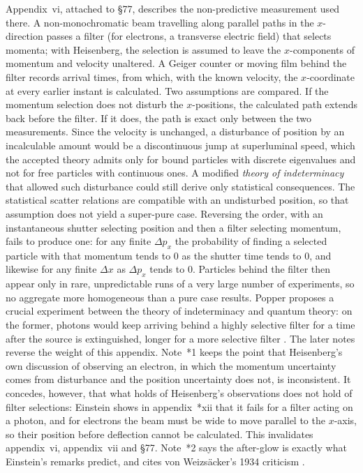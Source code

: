 Appendix~vi, attached to \S77, describes the non-predictive measurement
used there. A non-monochromatic beam travelling along parallel paths in
the \(x\)-direction passes a filter (for electrons, a transverse electric
field) that selects momenta; with Heisenberg, the selection is assumed to
leave the \(x\)-components of momentum and velocity unaltered. A
Geiger counter or moving film behind the filter records arrival times,
from which, with the known velocity, the \(x\)-coordinate at every
earlier instant is calculated. Two assumptions are compared. If the
momentum selection does not disturb the \(x\)-positions, the calculated
path extends back before the filter. If it does, the path is exact only
between the two measurements. Since the velocity is unchanged, a
disturbance of position by an incalculable amount would be a
discontinuous jump at superluminal speed, which the accepted theory admits
only for bound particles with discrete eigenvalues and not for free
particles with continuous ones. A modified \emph{theory of
indeterminacy} that allowed such disturbance could still derive only
statistical consequences. The statistical scatter relations are
compatible with an undisturbed position, so that assumption does not
yield a super-pure case. Reversing the order, with an instantaneous
shutter selecting position and then a filter selecting momentum, fails
to produce one: for any finite \(\Delta p_x\) the probability of finding a
selected particle with that momentum tends to \(0\) as the shutter time
tends to \(0\), and likewise for any finite \(\Delta x\) as \(\Delta p_x\)
tends to \(0\). Particles behind the filter then appear only in rare,
unpredictable runs of a very large number of experiments, so no aggregate
more homogeneous than a pure case results. Popper proposes a crucial
experiment between the theory of indeterminacy and quantum theory: on the
former, photons would keep arriving behind a highly selective filter
for a time after the source is extinguished, longer for a more selective
filter \parencite[appendix~vi, pp.~301--304]{Popper2002LogicDiscoveryUI}.
The later notes reverse the weight of this appendix. Note~*1 keeps the
point that Heisenberg's own discussion of observing an electron, in which
the momentum uncertainty comes from disturbance and the position
uncertainty does not, is inconsistent. It concedes, however, that what
holds of Heisenberg's observations does not hold of filter selections:
Einstein shows in appendix~*xii that it fails for a filter acting on a
photon, and for electrons the beam must be wide to move parallel to the
\(x\)-axis, so their position before deflection cannot be calculated.
This invalidates appendix~vi, appendix~vii and \S77. Note~*2 says the
after-glow is exactly what Einstein's remarks predict, and cites von
Weizsäcker's 1934 criticism \parencite[appendix~vi, notes~*1,
*2, pp.~301--304]{Popper2002LogicDiscoveryUI}.

